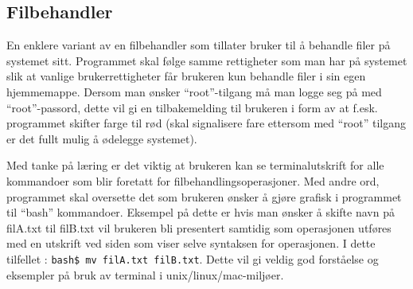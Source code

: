 \subsection{Filbehandler}
En enklere variant av en filbehandler som tillater bruker til å behandle filer på systemet sitt. Programmet skal følge samme rettigheter som man har på systemet slik at vanlige brukerrettigheter får brukeren kun behandle filer i sin egen hjemmemappe. Dersom man ønsker “root”-tilgang må man logge seg på med “root”-passord, dette vil gi en tilbakemelding til brukeren i form av at f.esk. programmet skifter farge til rød (skal signalisere fare ettersom med “root” tilgang er det fullt mulig å ødelegge systemet). 


Med tanke på læring er det viktig at brukeren kan se terminalutskrift for alle kommandoer som blir foretatt for filbehandlingsoperasjoner. Med andre ord, programmet skal oversette det som brukeren ønsker å gjøre grafisk i programmet til “bash” kommandoer. Eksempel på dette er hvis man ønsker å skifte navn på filA.txt til filB.txt vil brukeren bli presentert samtidig som operasjonen utføres med en utskrift ved siden som viser selve syntaksen for operasjonen. I dette tilfellet : \texttt{bash\$ mv filA.txt filB.txt}. Dette vil gi veldig god forståelse og eksempler på bruk av terminal i unix/linux/mac-miljøer.